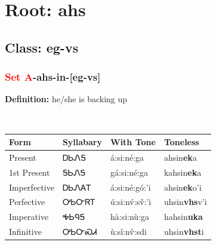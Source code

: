 \needspace{4in}
\section*{Root: ahs}
\nopagebreak
{}
\needspace{3in}
\subsection*{Class: eg-vs}
\nopagebreak
\needspace{2in}
\subsubsection*{\textcolor{Red}{Set A}{-}\textbf{ahs}{-}in{-}[eg-vs]}
\nopagebreak
\textbf{Definition: } he/she is backing up
\\[0.5em]
\begin{tabularx}{\textwidth}{l X X X}%
\toprule%
\textbf{Form}&\textbf{Syllabary}&\textbf{With Tone}&\textbf{Toneless}\\%
\midrule%
Present&ᎠᏏᏁᎦ&á:si:né:ga&ahsin\textbf{ek}a\\%
1st Present&ᎦᏏᏁᎦ&gá:si:né:ga&kahsin\textbf{ek}a\\%
Imperfective&ᎠᏏᏁᎪᎢ&á:si:né:gó:’i&ahsin\textbf{ek}o'i\\%
Perfective&ᎤᏏᏅᏒᎢ&ú:si:nv́:sv̌:’i&uhsin\textbf{vhs}v'i\\%
Imperative&ᎭᏏᏄᎦ&hà:si:nù:ga&hahsin\textbf{uka}\\%
Infinitive&ᎤᏏᏅᏍᏗ&ù:sǐ:nv̂:sdi&uhsin\textbf{vhst}i\\%
\bottomrule%
\end{tabularx}
\\[1em]